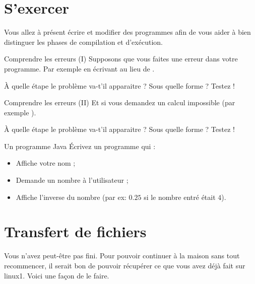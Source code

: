\documentclass[a4paper,11pt]{style-esi/td}
\begin{document}
\section{S'exercer}  

	Vous allez à présent écrire et modifier des programmes
	afin de vous aider à bien distinguer les phases de compilation et d'exécution. 

	\begin{Exercice}{Comprendre les erreurs (I)}
		Supposons que vous faites une erreur dans votre programme.
		Par exemple en écrivant  
		au lieu de .

		À quelle étape le problème va-t'il apparaitre ?
		Sous quelle forme ? Testez !
	\end{Exercice}

	\begin{Exercice}{Comprendre les erreurs (II)}
		Et si vous demandez un calcul impossible (par exemple ).

		À quelle étape le problème va-t'il apparaitre ?
		Sous quelle forme ? Testez !
	\end{Exercice}

	\begin{Exercice}{Un programme Java}
		Écrivez un programme qui :
		\begin{itemize}
		\item Affiche votre nom ;
		\item Demande un nombre à l'utilisateur ;
		\item Affiche l'inverse du nombre (par ex: $0.25$ si le nombre entré était $4$).
		\end{itemize}
	\end{Exercice}

\section{Transfert de fichiers}  

	Vous n'avez peut-être pas fini. Pour pouvoir continuer à la maison sans tout recommencer, 
    il serait bon de pouvoir récupérer ce que vous avez déjà fait sur linux1.
	Voici une façon de le faire.			
				
\end{document}
